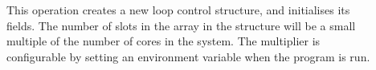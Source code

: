 \begin{description}
\item[]
This operation creates a new loop control structure,
and initialises its fields.
The number of slots in the array in the structure
will be a small multiple of the number of cores in the system.
The multiplier is configurable
by setting an environment variable when the program is run.

%
%
%
%
%
%


\end{description}
